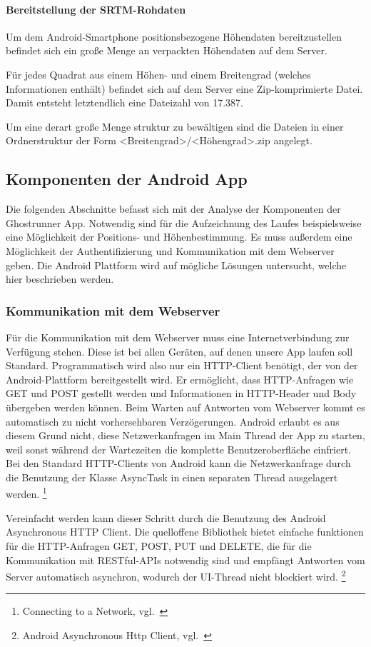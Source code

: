 \paragraph{Bereitstellung der SRTM-Rohdaten}
Um dem Android-Smartphone positionsbezogene Höhendaten bereitzustellen befindet sich ein große Menge an verpackten Höhendaten auf dem Server.

Für jedes Quadrat aus einem Höhen- und einem Breitengrad (welches Informationen enthält) befindet sich auf dem Server eine Zip-komprimierte Datei. Damit entsteht letztendlich eine Dateizahl von 17.387.

Um eine derart große Menge struktur zu bewältigen sind die Dateien in einer Ordnerstruktur der Form <Breitengrad>/<Höhengrad>.zip angelegt.
\subsection{Komponenten der Android App}
Die folgenden Abschnitte befasst sich mit der Analyse der Komponenten der Ghostrunner App. Notwendig sind für die Aufzeichnung des Laufes beispielsweise eine Möglichkeit der Positions- und Höhenbestimmung. Es muss außerdem eine Möglichkeit der Authentifizierung und Kommunikation mit dem Webserver geben. Die Android Plattform wird auf mögliche Lösungen untersucht, welche hier beschrieben werden.
\subsubsection{Kommunikation mit dem Webserver}
Für die Kommunikation mit dem Webserver muss eine Internetverbindung zur Verfügung stehen. Diese ist bei allen Geräten, auf denen unsere App laufen soll Standard. Programmatisch wird also nur ein HTTP-Client benötigt, der von der Android-Plattform bereitgestellt wird. Er ermöglicht, dass  HTTP-Anfragen wie GET und POST gestellt werden und Informationen in HTTP-Header und Body übergeben werden können. Beim Warten auf Antworten vom Webserver kommt es automatisch zu nicht vorhersehbaren Verzögerungen. Android erlaubt es aus diesem Grund nicht, diese Netzwerkanfragen im Main Thread der App zu starten, weil sonst während der Wartezeiten die komplette Benutzeroberfläche einfriert. Bei den Standard HTTP-Clients von Android kann die Netzwerkanfrage durch die Benutzung der Klasse AsyncTask in einen separaten Thread ausgelagert werden. \footnote{Connecting to a Network, vgl.~\cite{androidnetwork}}

Vereinfacht werden kann dieser Schritt durch die Benutzung des Android Asynchronous HTTP Client. Die quelloffene Bibliothek bietet einfache funktionen für die HTTP-Anfragen GET, POST, PUT und DELETE, die für die Kommunikation mit RESTful-APIs notwendig sind und empfängt Antworten vom Server automatisch asynchron, wodurch der UI-Thread nicht blockiert wird. \footnote{Android Asynchronous Http Client, vgl.~\cite{loopj}}
